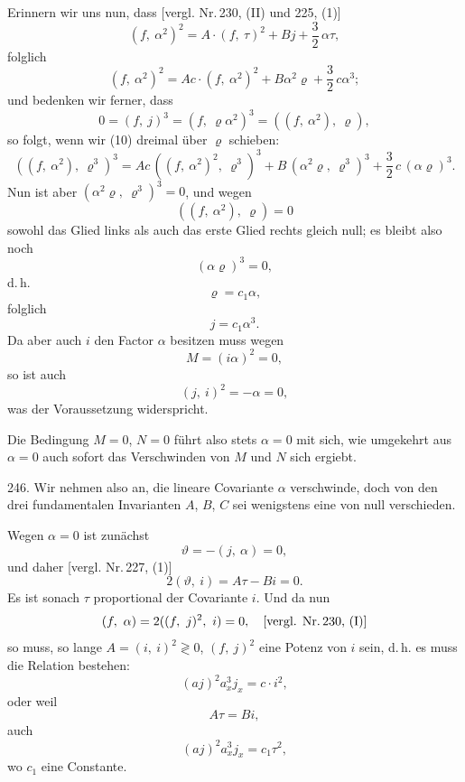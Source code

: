 \documentclass[11pt]{article}
\providecommand{\weberpage}[1]{}
\providecommand{\weq}[2]{\begin{equation}\tag{#1}#2\end{equation}}
\begin{document}
Erinnern wir uns nun, dass [vergl. Nr.\,230, (II) und 225, (1)]
\weq{12}{(f,\ \alpha^2)^2 = A\cdot(f,\ \tau)^2 + Bj + \frac{3}{2}\,\alpha\tau,}
folglich
\[
(f,\ \alpha^2)^2 = Ac\cdot(f,\ \alpha^2)^2 + B\alpha^2\varrho + \frac{3}{2}\,c\alpha^3;
\]
und bedenken wir ferner, dass
\[
0 = (f,\ j)^3 = (f,\ \varrho\alpha^2)^3 = ((f,\ \alpha^2),\ \varrho),
\]
so folgt, wenn wir (10) dreimal \"uber $\varrho$ schieben:
\[
((f,\ \alpha^2),\ \varrho^3)^3 = Ac\,((f,\ \alpha^2)^2,\ \varrho^3)^3 + B\,(\alpha^2\varrho,\ \varrho^3)^3 + \frac{3}{2}\,c\,(\alpha\varrho)^3.
\]
Nun ist aber $(\alpha^2\varrho,\ \varrho^3)^3 = 0$, und wegen
\[
((f,\ \alpha^2),\ \varrho) = 0
\]
sowohl das Glied links als auch das erste Glied rechts gleich null; es bleibt also noch
\[
(\alpha\varrho)^3 = 0,
\]
d.\,h.
\[
\varrho = c_1\alpha,
\]
folglich
\[
j = c_1\alpha^3.
\]
Da aber auch $i$ den Factor $\alpha$ besitzen muss wegen
\[
M = (i\alpha)^2 = 0,
\]
so ist auch
\[
(j,\ i)^2 = -\alpha = 0,
\]
was der Voraussetzung widerspricht.

Die Bedingung $M=0$, $N=0$ f\"uhrt also stets $\alpha=0$ mit sich, wie umgekehrt aus $\alpha=0$ auch sofort das Verschwinden von $M$ und $N$ sich ergiebt.


\weberpage{272}
246. Wir nehmen also an, die lineare Covariante $\alpha$ verschwinde, doch von den drei fundamentalen Invarianten $A$, $B$, $C$ sei wenigstens eine von null verschieden.

Wegen $\alpha=0$ ist zun\"achst
\[
\vartheta = -(j,\ \alpha) = 0,
\]
und daher [vergl. Nr.\,227, (1)]
\[
2(\vartheta,\ i) = A\tau - Bi = 0.
\]
Es ist sonach $\tau$ proportional der Covariante $i$. Und da nun
\[
(f,\ \alpha) = 2((f,\ j)^2,\ i) = 0, \quad \text{[vergl. Nr.\,230, (I)]}
\]
so muss, so lange $A=(i,\ i)^2\gtrless 0$, $(f,\ j)^2$ eine Potenz von $i$ sein, d.\,h. es muss die Relation bestehen:
\[
(aj)^2 a_x^3 j_x = c\cdot i^2,
\]
oder weil
\[
A\tau = Bi,
\]
auch
\[
(aj)^2 a_x^3 j_x = c_1\tau^2,
\]
wo $c_1$ eine Constante.
\end{document}
